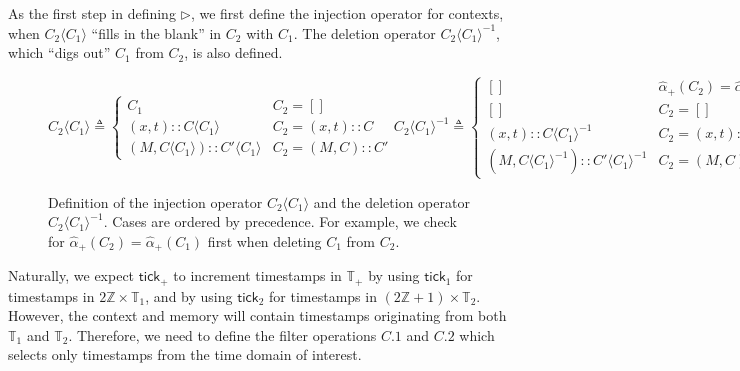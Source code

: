 \documentclass{article}
\theoremstyle{definition}
\newcommand*{\cons}{::}
\newcommand*{\A}[1]{\widehat{#1}}
\newcommand*{\Time}{\mathbb{T}}
\newcommand*{\tick}{\mathsf{tick}}
\newcommand*{\inject}[2]{{#2}\langle{#1}\rangle}
\newcommand*{\delete}[2]{{#2}{\langle{#1}\rangle}^{-1}}
\begin{document}
As the first step in defining $\rhd$, we first define the injection operator for contexts, when $\inject{C_1}{C_2}$ ``fills in the blank'' in $C_2$ with $C_1$.
The deletion operator $\delete{C_1}{C_2}$, which ``digs out'' $C_1$ from $C_2$, is also defined.
\begin{figure}[h!]
  \[
    \inject{C_{1}}{C_{2}}\triangleq
    \begin{cases}
      C_1                                           & C_{2}=[]            \\
      (x, t)\cons\inject{C_{1}}{C}                  & C_{2}=(x,t)\cons C  \\
      (M, \inject{C_{1}}{C})\cons\inject{C_{1}}{C'} & C_{2}=(M,C)\cons C'
    \end{cases}
    \delete{C_{1}}{C_{2}}\triangleq
    \begin{cases}
      []                                            & \A\alpha_+(C_{2})=\A\alpha_+(C_{1}) \\
      []                                            & C_{2}=[]                            \\
      (x,t)\cons\delete{C_{1}}{C}                   & C_{2}=(x,t)\cons C                  \\
      (M, \delete{C_{1}}{C})\cons\delete{C_{1}}{C'} & C_{2}=(M, C)\cons C'
    \end{cases}
  \]
  \caption{Definition of the injection operator $\inject{C_1}{C_2}$ and the deletion operator $\delete{C_1}{C_2}$.
    Cases are ordered by precedence.
    For example, we check for $\A\alpha_+(C_2)=\A\alpha_+(C_1)$ first when deleting $C_1$ from $C_2$.}
  \label{fig:concinject}
\end{figure}

Naturally, we expect $\tick_+$ to increment timestamps in $\Time_+$ by using $\tick_1$ for timestamps in $2\mathbb{Z}\times\Time_1$, and by using $\tick_2$ for timestamps in $(2\mathbb{Z}+1)\times\Time_2$.
However, the context and memory will contain timestamps originating from both $\Time_1$ and $\Time_2$.
Therefore, we need to define the filter operations $C.1$ and $C.2$ which selects only timestamps from the time domain of interest.
\end{document}
